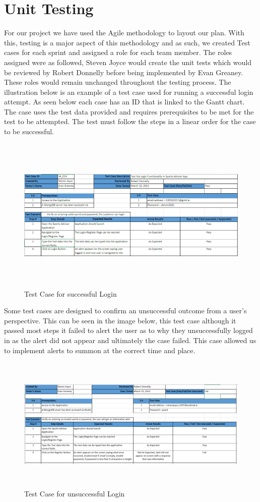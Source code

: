 \section{Unit Testing}
For our project we have used the Agile methodology to layout our plan. With this, testing is a major aspect of this methodology and as such, we created Test cases for each sprint and assigned a role for each team member. The roles assigned were as followed, Steven Joyce would create the unit tests which would be reviewed by Robert Donnelly before being implemented by Evan Greaney. These roles would remain unchanged throughout the testing process.
\newline
\newline
The illustration below is an example of a test case used for running a successful login attempt. As seen below each case has an ID that is linked to the Gantt chart. The case uses the test data provided and requires prerequisites to be met for the test to be attempted. The test must follow the steps in a linear order for the case to be successful.
\begin{figure}[H]
    \centering
    \includegraphics[width=15cm, height = 7.5cm]{img/TestCasePass.PNG}
    \caption{Test Case for successful Login}
    \label{fig:altas config}
\end{figure}
Some test cases are designed to confirm an unsuccessful outcome from a user's perspective. This can be seen in the image below, this test case although it passed most steps it failed to alert the user as to why they unsuccessfully logged in as the alert did not appear and ultimately the case failed. This case allowed us to implement alerts to summon at the correct time and place.
\begin{figure}[H]
    \centering
    \includegraphics[width=15cm, height = 6.5cm]{img/TestCaseFail.PNG}
    \caption{Test Case for unsuccessful Login}
    \label{fig:altas config}
\end{figure}
